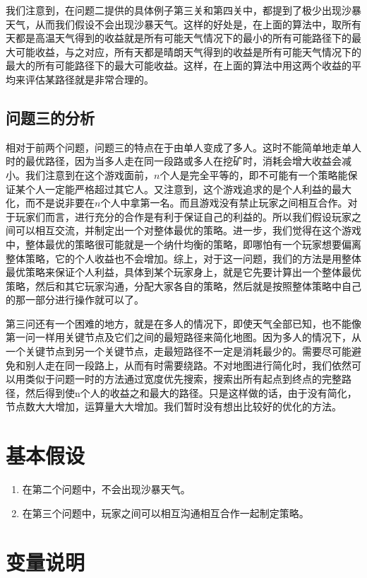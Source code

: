 \documentclass[withoutpreface,bwprint]{cumcmthesis} %
\begin{document}
我们注意到，在问题二提供的具体例子第三关和第四关中，都提到了极少出现沙暴天气，从而我们假设不会出现沙暴天气。这样的好处是，在上面的算法中，取所有天都是高温天气得到的收益就是所有可能天气情况下的最小的所有可能路径下的最大可能收益，与之对应，所有天都是晴朗天气得到的收益是所有可能天气情况下的最大的所有可能路径下的最大可能收益。这样，在上面的算法中用这两个收益的平均来评估某路径就是非常合理的。

\subsection{问题三的分析}
相对于前两个问题，问题三的特点在于由单人变成了多人。这时不能简单地走单人时的最优路径，因为当多人走在同一段路或多人在挖矿时，消耗会增大收益会减小。我们注意到在这个游戏面前，$n$个人是完全平等的，即不可能有一个策略能保证某个人一定能严格超过其它人。又注意到，这个游戏追求的是个人利益的最大化，而不是说非要在$n$个人中拿第一名。而且游戏没有禁止玩家之间相互合作。对于玩家们而言，进行充分的合作是有利于保证自己的利益的。所以我们假设玩家之间可以相互交流，并制定出一个对整体最优的策略。进一步，我们觉得在这个游戏中，整体最优的策略很可能就是一个纳什均衡的策略，即哪怕有一个玩家想要偏离整体策略，它的个人收益也不会增加。综上，对于这一问题，我们的方法是用整体最优策略来保证个人利益，具体到某个玩家身上，就是它先要计算出一个整体最优策略，然后和其它玩家沟通，分配大家各自的策略，然后就是按照整体策略中自己的那一部分进行操作就可以了。

第三问还有一个困难的地方，就是在多人的情况下，即使天气全部已知，也不能像第一问一样用关键节点及它们之间的最短路径来简化地图。因为多人的情况下，从一个关键节点到另一个关键节点，走最短路径不一定是消耗最少的。需要尽可能避免和别人走在同一段路上，从而有时需要绕路。不对地图进行简化时，我们依然可以用类似于问题一时的方法通过宽度优先搜索，搜索出所有起点到终点的完整路径，然后得到使n个人的收益之和最大的路径。只是这样做的话，由于没有简化，节点数大大增加，运算量大大增加。我们暂时没有想出比较好的优化的方法。


\section{基本假设}

\begin{enumerate}
    \item 在第二个问题中，不会出现沙暴天气。
    \item 在第三个问题中，玩家之间可以相互沟通相互合作一起制定策略。
\end{enumerate}

\section{变量说明}
\end{document}
